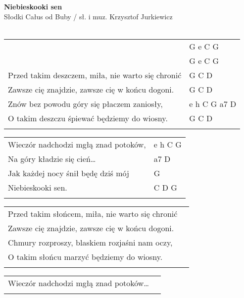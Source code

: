 \documentclass[a5paper]{article}
\begin{document}


\noindent
\fontsize{12pt}{15pt}\selectfont
\textbf{Niebieskooki sen} \\
\fontsize{8pt}{10pt}\selectfont
Słodki Całus od Buby / sł. i muz. Krzysztof Jurkiewicz \\ \\
\fontsize{10pt}{12pt}\selectfont
{}
\begin{tabular}{@{}p{8.50cm}p{3cm}@{}}
\noindent
 & G e C G \\
 & G e C G \\
Przed takim deszczem, miła, nie warto się chronić & G C D \\
Zawsze cię znajdzie, zawsze cię w końcu dogoni.	& G C D \\
Znów bez powodu góry się płaczem zaniosły, & e h C G a7 D \\
O takim deszczu śpiewać będziemy do wiosny. & G C D \\ \\
\end{tabular}

\noindent
\begin{tabular}{@{}p{7.50cm}p{3cm}@{}}
Wieczór nadchodzi mgłą znad potoków, & e h C G \\
Na góry kładzie się cień… & a7 D \\
Jak każdej nocy śnił będę dziś mój & G \\
Niebieskooki sen. & C D G \\ \\
\end{tabular}

\noindent
\begin{tabular}{@{}p{7.50cm}p{3cm}@{}}
Przed takim słońcem, miła, nie warto się chronić \\
Zawsze cię znajdzie, zawsze cię w końcu dogoni. \\
Chmury rozproszy, blaskiem rozjaśni nam oczy, \\
O takim słońcu marzyć będziemy do wiosny. \\ \\
\end{tabular}

\noindent
\begin{tabular}{@{}p{7.50cm}p{3cm}@{}}
Wieczór nadchodzi mgłą znad potoków… \\ \\
\end{tabular}
\end{document}
